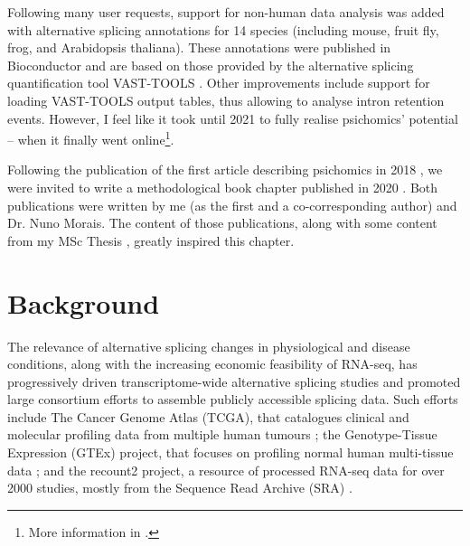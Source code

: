 Following many user requests, support for non-human data analysis was added with alternative splicing annotations for 14 species (including mouse, fruit fly, frog, and Arabidopsis thaliana). These annotations were published in Bioconductor \cite{} and are based on those provided by the alternative splicing quantification tool VAST-TOOLS \cite{irimia:2014wt,tapial:2017ui}. Other improvements include support for loading VAST-TOOLS output tables, thus allowing to analyse intron retention events. However, I feel like it took until 2021 to fully realise psichomics' potential -- when it finally went online\footnote{More information in .}.

Following the publication of the first article describing psichomics in 2018 \cite{saraiva-agostinho:2018uq}, we were invited to write a methodological book chapter published in 2020 \cite{saraiva-agostinho:2020wz}. Both publications were written by me (as the first and a co-corresponding author) and Dr. Nuno Morais. The content of those publications, along with some content from my MSc Thesis \cite{}, greatly inspired this chapter.

\section{Background}


The relevance of alternative splicing changes in physiological and disease conditions, along with the increasing economic feasibility of RNA-seq, has progressively driven transcriptome-wide alternative splicing studies \cite{wang:2008wa,tsai:2015ve,danan-gotthold:2015ut,chhibber:2017wm,climente-gonzalez:2017uj} and promoted large consortium efforts to assemble publicly accessible splicing data. Such efforts include The Cancer Genome Atlas (TCGA), that catalogues clinical and molecular profiling data from multiple human tumours \cite{chang:2013ww}; the Genotype-Tissue Expression (GTEx) project, that focuses on profiling normal human multi-tissue data \cite{lonsdale:2013uo}; and the recount2 project, a resource of processed RNA-seq data for over 2000 studies, mostly from the Sequence Read Archive (SRA) \cite{collado-torres:2017uw}.

